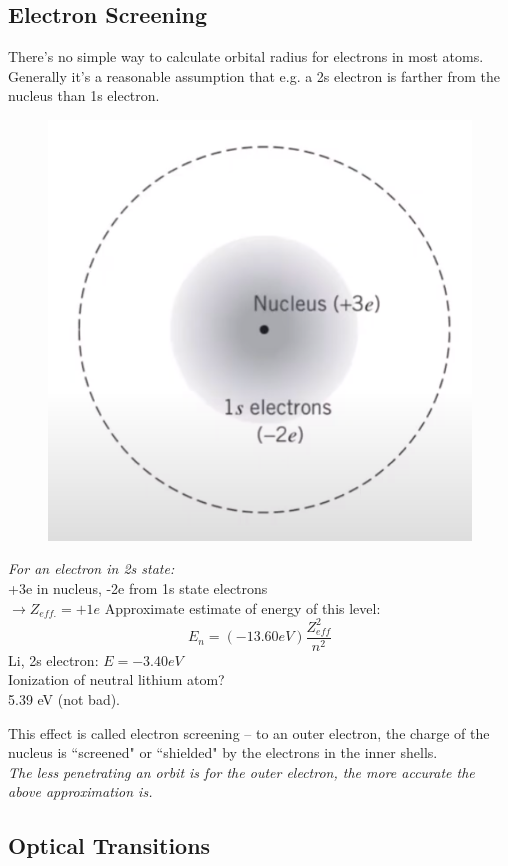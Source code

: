 \documentclass[class=article,crop=false]{standalone}
\begin{document}
\newpage
\subsection{Electron Screening}

There's no simple way to calculate orbital radius for electrons in most atoms. 
Generally it's a reasonable assumption that e.g. a 2s electron is farther from the nucleus than 1s electron.\\

\begin{figure}[h!]
	\centering
	\includegraphics[width=.5\linewidth]{./Images/lithium.png}
	\caption{}
\end{figure}

\begin{result}
	\emph{For an electron in 2s state:}\\
	+3e in nucleus, -2e from 1s state electrons \\
	$\rightarrow Z_{eff.} = +1e$
	Approximate estimate of energy of this level:
	$$ E_n = (-13.60 eV) \frac{Z_{eff}^2}{n^2} $$
	Li, 2s electron: $E = -3.40 eV$ \\
	Ionization of neutral lithium atom? \\
	5.39 eV (not bad).
\end{result}

This effect is called electron screening -- to an outer electron, the charge of the nucleus is ``screened" or ``shielded" by the electrons in the inner shells.\\

\emph{The less penetrating an orbit is for the outer electron, the more accurate
the above approximation is.}

\newpage
\subsection{Optical Transitions}
\end{document}
